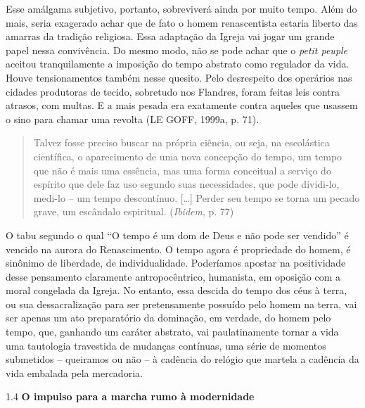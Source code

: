 Esse amálgama subjetivo, portanto, sobreviverá ainda por muito tempo.
Além do mais, seria exagerado achar que de fato o homem renascentista
estaria liberto das amarras da tradição religiosa. Essa adaptação da
Igreja vai jogar um grande papel nessa convivência. Do mesmo modo, não
se pode achar que o \emph{petit peuple} aceitou tranquilamente a
imposição do tempo abstrato como regulador da vida. Houve tensionamentos
também nesse quesito. Pelo desrespeito dos operários nas cidades
produtoras de tecido, sobretudo nos Flandres, foram feitas leis contra
atrasos, com multas. E a mais pesada era exatamente contra aqueles que
usassem o sino para chamar uma revolta (LE GOFF, 1999a, p. 71).

\begin{quote}
Talvez fosse preciso buscar na própria ciência, ou seja, na escolástica
científica, o aparecimento de uma nova concepção do tempo, um tempo que
não é mais uma essência, mas uma forma conceitual a serviço do espírito
que dele faz uso segundo suas necessidades, que pode dividi-lo, medi-lo
-- um tempo descontínuo. {[}\ldots{}{]} Perder seu tempo se torna um
pecado grave, um escândalo espiritual. (\emph{Ibidem}, p. 77)
\end{quote}

O tabu segundo o qual ``O tempo é um dom de Deus e não pode ser
vendido'' é vencido na aurora do Renascimento. O tempo agora é
propriedade do homem, é sinônimo de liberdade, de individualidade.
Poderíamos apostar na positividade desse pensamento claramente
antropocêntrico, humanista, em oposição com a moral congelada da Igreja.
No entanto, essa descida do tempo dos céus à terra, ou sua
dessacralização para ser pretensamente possuído pelo homem na terra, vai
ser apenas um ato preparatório da dominação, em verdade, do homem pelo
tempo, que, ganhando um caráter abstrato, vai paulatinamente tornar a
vida uma tautologia travestida de mudanças contínuas, uma série de
momentos submetidos -- queiramos ou não -- à cadência do relógio que
martela a cadência da vida embalada pela mercadoria.

1.4 \textbf{O impulso para a marcha rumo à modernidade}

